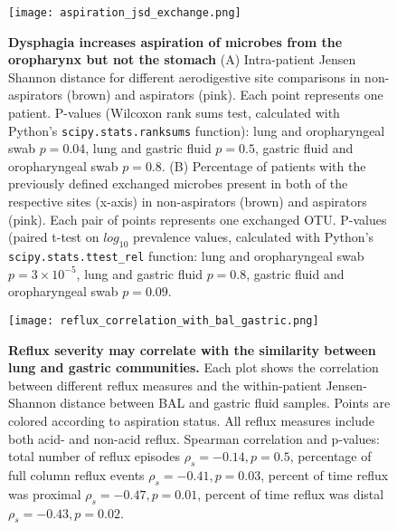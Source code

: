 \documentclass{article}
\begin{document}
\begin{figure}[h]
        \begin{center}\texttt{[image: aspiration\_jsd\_exchange.png]}
        \caption{\textbf{Dysphagia increases aspiration of microbes from the oropharynx but not the stomach} (A) Intra-patient Jensen Shannon distance for different aerodigestive site comparisons in non-aspirators (brown) and aspirators (pink). Each point represents one patient. P-values (Wilcoxon rank sums test, calculated with Python's \texttt{scipy.stats.ranksums} function): lung and oropharyngeal swab $p = 0.04$, lung and gastric fluid $p = 0.5$, gastric fluid and oropharyngeal swab $p = 0.8$. (B) Percentage of patients with the previously defined exchanged microbes present in both of the respective sites (x-axis) in non-aspirators (brown) and aspirators (pink). Each pair of points represents one exchanged OTU. P-values (paired t-test on $log_{10}$ prevalence values, calculated with Python's \texttt{scipy.stats.ttest\_rel} function: lung and oropharyngeal swab $p = 3 \times 10^{-5}$, lung and gastric fluid $p = 0.8$, gastric fluid and oropharyngeal swab $p = 0.09$.}
        \label{fig:aspiration}
        \end{center}
\end{figure}

\begin{figure}[h]
        \begin{center}\texttt{[image: reflux\_correlation\_with\_bal\_gastric.png]}
        \caption{\textbf{Reflux severity may correlate with the similarity between lung and gastric communities.} Each plot shows the correlation between different reflux measures and the within-patient Jensen-Shannon distance between BAL and gastric fluid samples. Points are colored according to aspiration status. All reflux measures include both acid- and non-acid reflux. Spearman correlation and p-values: total number of reflux episodes $\rho_s = -0.14, p = 0.5$, percentage of full column reflux events $\rho_s = -0.41, p = 0.03$, percent of time reflux was proximal $\rho_s = -0.47, p = 0.01$, percent of time reflux was distal $\rho_s = -0.43, p = 0.02$.}
        \label{fig:reflux_corr}
        \end{center}
\end{figure}
\end{document}
